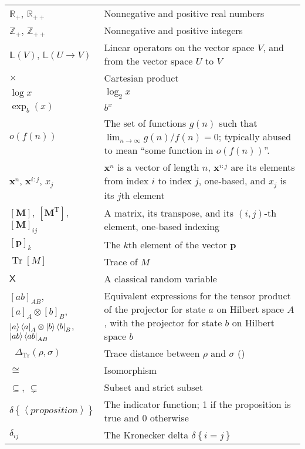 \documentclass[10pt, a4paper]{article}
\numberwithin{equation}{section} %
\theoremstyle{definition}
\theoremstyle{plain}
\newcommand{\?}{\mathrel{?}} %
\newcommand{\Z}{\mathbb{Z}} %
\newcommand{\R}{\mathbb{R}} %
\newcommand{\Lin}[1]{\mathbb{L}\left(#1\right)}
\newcommand{\tpose}{\mathrm{T}}
\newcommand{\cvec}[1]{\boldsymbol{\mathbf{#1}}}    %
\newcommand{\matr}[2][]{\left[\mathbf{#2}#1\right]} %
\newcommand{\angleb}[1]{\left\langle #1 \right\rangle} %
\newcommand{\indic}[1]{\delta{\left\{#1\right\}}} %
\newcommand{\Tr}[2][]{\mathop{\mathrm{Tr}#1}\left[ #2 \right]} %
\newcommand{\Trdist}[2]{\mathop{}\Delta_\mathrm{Tr}\left(#1, #2\right)}
\newcommand{\crv}[1]{\mathsf{#1}}
\newcommand{\proj}[2][]{{[#2]}_{#1}}
\begin{document}
    \begin{center}
      \begin{longtable*}{p{0.2\linewidth}|p{0.8\linewidth}}
        \(\R_+\), \(\R_{++}\) & Nonnegative and positive real numbers \\
        \(\Z_+\), \(\Z_{++}\) & Nonnegative and positive integers \\
        \(\Lin{V}\), \(\Lin{U\to V}\) & Linear operators on the vector space \(V\), and from the vector space \(U\) to \(V\) \\
        \(\times\) & Cartesian product \\
        \(\log x\) & \(\log_2 x\) \\
        \(\exp_b(x)\) & \(b^x\) \\
        \(o(f(n))\) & The set of functions \(g(n)\) such that \(\lim_{n\to\infty} g(n)/f(n) = 0\); typically abused to mean ``some function in \(o(f(n))\)''. \\
        \(\cvec{x}^n\), \(\cvec{x}^{i:j}\), \(x_j\) & \(\cvec{x}^n\) is a vector of length \(n\), \(\cvec{x}^{i:j}\) are its elements from index \(i\) to index \(j\), one-based, and \(x_j\) is its \(j\)th element \\
        \(\matr{M}\), \(\matr[^{\tpose}]{M}\), \(\matr{M}_{ij}\) & A matrix, its transpose, and its \((i,j)\)-th element, one-based indexing \\
        \(\matr{p}_k\) & The \(k\)th element of the vector \(\cvec{p}\) \\
        \(\Tr{M}\) & Trace of \(M\) \\
        \(\crv{X}\) & A classical random variable \\
        \(\proj[AB]{ab}\), \(\proj[A]{a} \otimes \proj[B]{b}\), \({\ket{a}\bra{a}}_A \otimes {\ket{b}\bra{b}}_B\), \({\ket{ab}\bra{ab}}_{AB}\) & Equivalent expressions for the tensor product of the projector for state \(a\) on Hilbert space \(A\), with the projector for state \(b\) on Hilbert space \(b\) \\
        \(\Trdist{\rho}{\sigma}\) & Trace distance between \(\rho\) and \(\sigma\) () \\
        \(\cong\) & Isomorphism \\
        \(\subseteq\), \(\subsetneq\) & Subset and strict subset \\
        \(\indic{\angleb{proposition}}\) & The indicator function; 1 if the proposition is true and 0 otherwise \\
        \(\delta_{ij}\) & The Kronecker delta \(\indic{i = j}\) \\

\end{longtable*}
\end{center}
\end{document}
